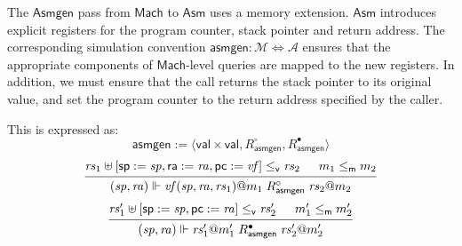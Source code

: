 \documentclass[11pt,oneside]{book}
\theoremstyle{definition}
\newcommand{\kw}[1]{\ensuremath{ \mathsf{#1} }}
\newcommand{\que}{\circ}         %
\newcommand{\ans}{\bullet}       %
\newcommand{\vref}{\le_\kw{v}}   %
\newcommand{\mext}{\le_\kw{m}}   %
\begin{document}
The \kw{Asmgen} pass from \kw{Mach} to \kw{Asm}
uses a memory extension.
\kw{Asm} introduces explicit registers for the
program counter, stack pointer and return address.
The corresponding simulation convention
$\kw{asmgen} : \mathcal{M} \Leftrightarrow \mathcal{A}$
ensures that the appropriate components of
\kw{Mach}-level queries are mapped to the new registers.
In addition,
we must ensure that the call returns the stack pointer
to its original value,
and set the program counter to the return address
specified by the caller.


This is expressed as:
\[
  \kw{asmgen} := \langle \kw{val} \times \kw{val},
    R_\kw{asmgen}^\que, R_\kw{asmgen}^\ans \rangle
\]
\[
  \begin{prooftree}
  \hypo{\mathit{rs}_1 \uplus
    [\kw{sp} := \mathit{sp}, \kw{ra} := \mathit{ra}, \kw{pc} := \mathit{vf}]
    \vref \mathit{rs}_2}
  \hypo{m_1 \mext m_2}
  \infer2{
    (\mathit{sp}, \mathit{ra}) \Vdash
     \mathit{vf}(\mathit{sp}, \mathit{ra}, \mathit{rs}_1)@m_1
     \mathrel{R_\kw{asmgen}^\que}
     \mathit{rs}_2@m_2}
  \end{prooftree}
\]
\[
  \begin{prooftree}
  \hypo{
    \mathit{rs}_1' \uplus [\kw{sp} := \mathit{sp}, \kw{pc} := \mathit{ra}]
    \vref \mathit{rs}_2'}
  \hypo{m_1' \mext m_2'}
  \infer2{
    (\mathit{sp}, \mathit{ra}) \Vdash \mathit{rs}_1'@m_1'
    \mathrel{R_\kw{asmgen}^\ans}
    \mathit{rs}_2'@m_2'}
  \end{prooftree}
\]
\end{document}
